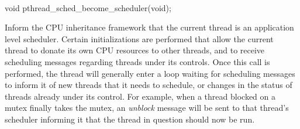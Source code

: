 
\begin{apisyn}
	\\

	\funcproto void	pthread_sched_become_scheduler(void);
\end{apisyn}
\begin{apidesc}
	Inform the CPU inheritance framework that the current thread is an
	application level scheduler. Certain initializations are performed
	that allow the current thread to donate its own CPU resources to
	other threads, and to receive scheduling messages regarding threads
	under its controls. Once this call is performed, the thread will
	generally enter a loop waiting for scheduling messages to inform it
	of new threads that it needs to schedule, or changes in the status
	of threads already under its control. For example, when a thread
	blocked on a mutex finally takes the mutex, an \emph{unblock}
	message will be sent to that thread's scheduler informing it that
	the thread in question should now be run.
\end{apidesc}


